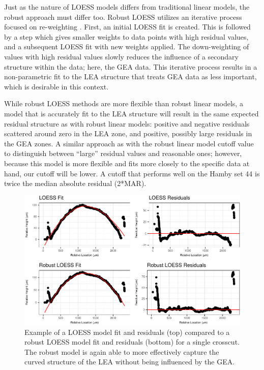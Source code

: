 \documentclass[12pt]{article}
\begin{document}
Just as the nature of LOESS models differs from traditional linear
models, the robust approach must differ too. Robust LOESS utilizes an
iterative process focused on re-weighting \citep[see][]{Cleveland1}.
First, an initial LOESS fit is created. This is followed by a step which
gives smaller weights to data points with high residual values, and a
subsequent LOESS fit with new weights applied. The down-weighting of
values with high residual values slowly reduces the influence of a
secondary structure within the data; here, the GEA data. This iterative
process results in a non-parametric fit to the LEA structure that treats
GEA data as less important, which is desirable in this context.

While robust LOESS methods are more flexible than robust linear models,
a model that is accurately fit to the LEA structure will result in the
same expected residual structure as with robust linear models: positive
and negative residuals scattered around zero in the LEA zone, and
positive, possibly large residuals in the GEA zones. A similar approach
as with the robust linear model cutoff value to distinguish between
``large'' residual values and reasonable ones; however, because this
model is more flexible and fits more closely to the specific data at
hand, our cutoff will be lower. A cutoff that performs well on the Hamby
set 44 is twice the median absolute residual (2*MAR).

\begin{figure}
\centering
\includegraphics{writeup_files/figure-latex/unnamed-chunk-4-1.pdf}
\caption{Example of a LOESS model fit and residuals (top) compared to a
robust LOESS model fit and residuals (bottom) for a single crosscut. The
robust model is again able to more effectively capture the curved
structure of the LEA without being influenced by the GEA.}
\end{figure}
\end{document}
